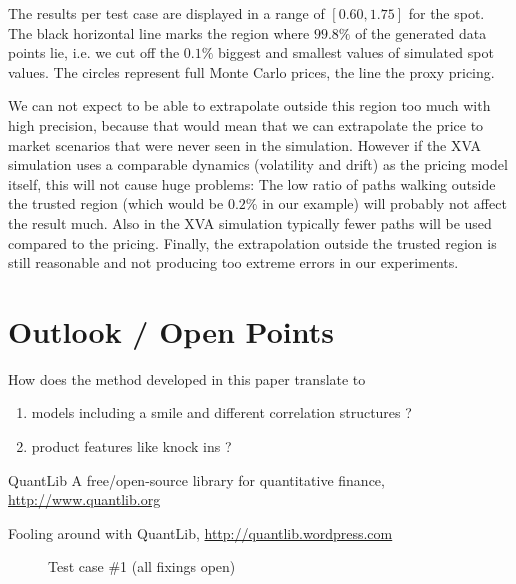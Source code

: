 \documentclass{amsart}
\theoremstyle{plain}
\numberwithin{equation}{section}
\begin{document}
The results per test case are displayed in a range of $[0.60, 1.75]$ for the spot. The black horizontal line marks the region where $99.8\%$ of the generated data points lie, i.e. we cut off the $0.1\%$ biggest and smallest values of simulated spot values. The circles represent full Monte Carlo prices, the line the proxy pricing. 

We can not expect to be able to extrapolate outside this region too much with high precision, because that would mean that we can extrapolate the price to market scenarios that were never seen in the simulation. However if the XVA simulation uses a comparable dynamics (volatility and drift) as the pricing model itself, this will not cause huge problems: The low ratio of paths walking outside the trusted region (which would be $0.2\%$ in our example) will probably not affect the result much. Also in the XVA simulation typically fewer paths will be used compared to the pricing. Finally, the extrapolation outside the trusted region is still reasonable and not producing too extreme errors in our experiments.


\section{Outlook / Open Points}

How does the method developed in this paper translate to 

\begin{enumerate}
\item models including a smile and different correlation structures ? 
\item product features like knock ins ?
\end{enumerate}

\begin{thebibliography}{2}

QuantLib A free/open-source library for quantitative finance, \url{http://www.quantlib.org}

Fooling around with QuantLib, \url{http://quantlib.wordpress.com}

\end{thebibliography}

\begin{figure}[htbp]
\caption{Test case \#1 (all fixings open)}
\label{payoff}
\end{figure}
\end{document}
